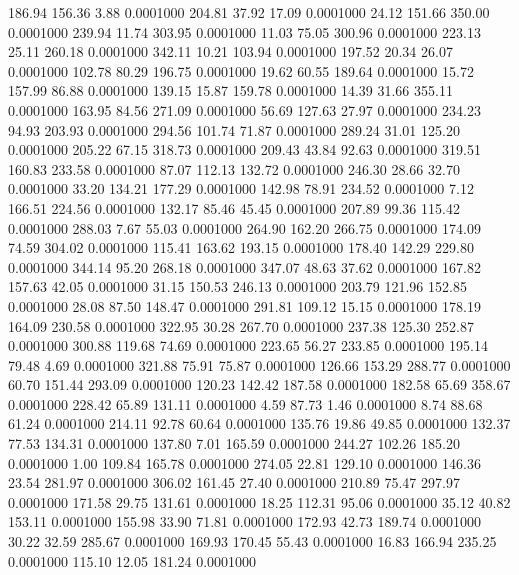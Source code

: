  186.94  156.36    3.88   0.0001000
 204.81   37.92   17.09   0.0001000
  24.12  151.66  350.00   0.0001000
 239.94   11.74  303.95   0.0001000
  11.03   75.05  300.96   0.0001000
 223.13   25.11  260.18   0.0001000
 342.11   10.21  103.94   0.0001000
 197.52   20.34   26.07   0.0001000
 102.78   80.29  196.75   0.0001000
  19.62   60.55  189.64   0.0001000
  15.72  157.99   86.88   0.0001000
 139.15   15.87  159.78   0.0001000
  14.39   31.66  355.11   0.0001000
 163.95   84.56  271.09   0.0001000
  56.69  127.63   27.97   0.0001000
 234.23   94.93  203.93   0.0001000
 294.56  101.74   71.87   0.0001000
 289.24   31.01  125.20   0.0001000
 205.22   67.15  318.73   0.0001000
 209.43   43.84   92.63   0.0001000
 319.51  160.83  233.58   0.0001000
  87.07  112.13  132.72   0.0001000
 246.30   28.66   32.70   0.0001000
  33.20  134.21  177.29   0.0001000
 142.98   78.91  234.52   0.0001000
   7.12  166.51  224.56   0.0001000
 132.17   85.46   45.45   0.0001000
 207.89   99.36  115.42   0.0001000
 288.03    7.67   55.03   0.0001000
 264.90  162.20  266.75   0.0001000
 174.09   74.59  304.02   0.0001000
 115.41  163.62  193.15   0.0001000
 178.40  142.29  229.80   0.0001000
 344.14   95.20  268.18   0.0001000
 347.07   48.63   37.62   0.0001000
 167.82  157.63   42.05   0.0001000
  31.15  150.53  246.13   0.0001000
 203.79  121.96  152.85   0.0001000
  28.08   87.50  148.47   0.0001000
 291.81  109.12   15.15   0.0001000
 178.19  164.09  230.58   0.0001000
 322.95   30.28  267.70   0.0001000
 237.38  125.30  252.87   0.0001000
 300.88  119.68   74.69   0.0001000
 223.65   56.27  233.85   0.0001000
 195.14   79.48    4.69   0.0001000
 321.88   75.91   75.87   0.0001000
 126.66  153.29  288.77   0.0001000
  60.70  151.44  293.09   0.0001000
 120.23  142.42  187.58   0.0001000
 182.58   65.69  358.67   0.0001000
 228.42   65.89  131.11   0.0001000
   4.59   87.73    1.46   0.0001000
   8.74   88.68   61.24   0.0001000
 214.11   92.78   60.64   0.0001000
 135.76   19.86   49.85   0.0001000
 132.37   77.53  134.31   0.0001000
 137.80    7.01  165.59   0.0001000
 244.27  102.26  185.20   0.0001000
   1.00  109.84  165.78   0.0001000
 274.05   22.81  129.10   0.0001000
 146.36   23.54  281.97   0.0001000
 306.02  161.45   27.40   0.0001000
 210.89   75.47  297.97   0.0001000
 171.58   29.75  131.61   0.0001000
  18.25  112.31   95.06   0.0001000
  35.12   40.82  153.11   0.0001000
 155.98   33.90   71.81   0.0001000
 172.93   42.73  189.74   0.0001000
  30.22   32.59  285.67   0.0001000
 169.93  170.45   55.43   0.0001000
  16.83  166.94  235.25   0.0001000
 115.10   12.05  181.24   0.0001000
